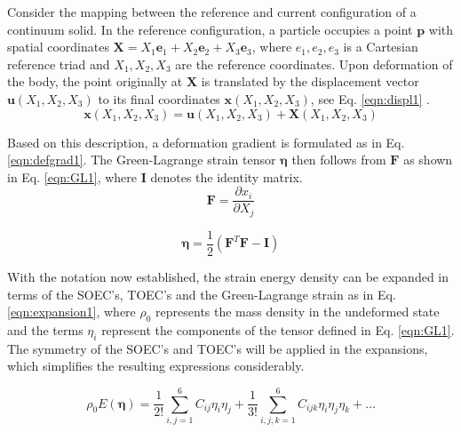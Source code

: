 \documentclass[showpacs,aps,floatfix,prb,reprint,superscriptaddress]{revtex4-1}
\begin{document}
Consider the mapping between the reference and current configuration of a continuum solid. In the reference configuration, a particle occupies a point $\bm{p}$ with spatial coordinates $\bm{X} = X_{1}\bm{e}_{1} +  X_{2}\bm{e}_{2} + X_{3}\bm{e}_{3}$, where ${e}_{1}, {e}_{2}, {e}_{3}$ is a Cartesian reference triad and $X_{1}, X_{2}, X_{3}$ are the reference coordinates. Upon deformation of the body, the point originally at $\bm{X}$ is translated by the displacement vector $\bm{u} \left(X_{1}, X_{2}, X_{3} \right)$ to its final coordinates $\bm{x} \left(X_{1}, X_{2}, X_{3} \right)$, see Eq. \ref{eqn:displ1} .
\begin{equation}
\label{eqn:displ1} 
\bm{x} \left(X_{1}, X_{2}, X_{3} \right) = \bm{u} \left(X_{1}, X_{2}, X_{3} \right) + \bm{X} \left(X_{1}, X_{2}, X_{3} \right)
\end{equation}

Based on this description, a deformation gradient is formulated as in Eq. \ref{eqn:defgrad1}. The Green-Lagrange strain tensor $\bm{\eta}$ then follows from $\bm{F}$ as shown in Eq. \ref{eqn:GL1}, where $\bm{I}$ denotes the identity matrix.
\begin{equation}
\label{eqn:defgrad1} 
\bm{F} = \frac{\partial x_{i}}{ \partial X_{j}}
\end{equation}

\begin{equation}
\label{eqn:GL1} 
\bm{\eta} = \frac{1}{2} \left(\bm{F}^{T} \bm{F} - \bm{I} \right)
\end{equation}

With the notation now established, the strain energy density can be expanded in terms of the SOEC's, TOEC's and the Green-Lagrange strain  as in Eq. \ref{eqn:expansion1}, where $\rho_{0}$ represents the mass density in the undeformed state and the terms $\eta_{i}$ represent the components of the tensor defined in Eq. \ref{eqn:GL1}. The symmetry of the SOEC's and TOEC's will be applied in the expansions, which simplifies the resulting expressions considerably.

\begin{equation}
\label{eqn:expansion1} 
\rho_{0} E \left(\bm{\eta}\right) = \frac{1}{2!} \sum_{i,j=1}^{6} C_{ij} \eta_{i} \eta_{j} + \frac{1}{3!} \sum_{i,j,k=1}^{6} C_{ijk} \eta_{i} \eta_{j} \eta_{k} + \ldots
\end{equation}
\end{document}
